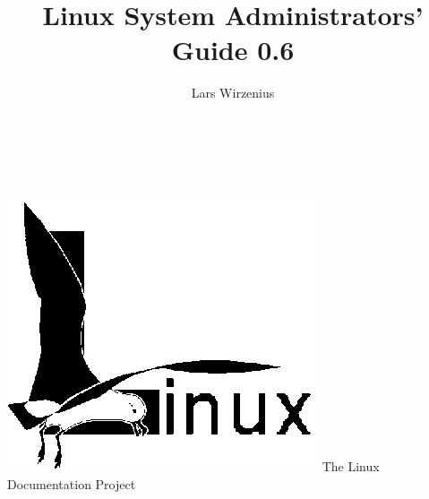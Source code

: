 

\thispagestyle{empty}
\pagestyle{empty}

\title{Linux System Administrators' Guide 0.6}
\author{Lars Wirzenius}
\date{}


 {}

\vspace{2in}

\makeatletter
\noindent \large \rm \@title
\makeatother
\newpage


 {}

\vspace{2in}

\makeatletter
\noindent \huge \rm \@title \\
\vspace{1in} \\
\large \rm \@author
\makeatother

\vfill

 {
\includegraphics{linux-logo.ps}
 { {{\normalsize The Linux Documentation Project}} \vspace{1em}}
}



